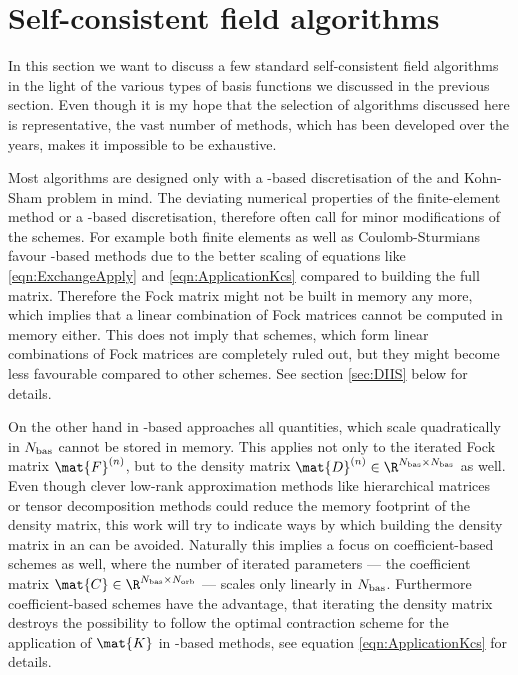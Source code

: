 \section{Self-consistent field algorithms}
\label{sec:SCFAlgorithms}

In this section we want to discuss a few standard self-consistent field algorithms
in the light of the various types of basis functions we discussed in the previous section.
Even though it is my hope that the selection of algorithms discussed here
is representative,
the vast number of methods,
which has been developed over the years,
makes it impossible to be exhaustive.

Most \SCF algorithms are designed only with a \cGTO-based
discretisation of the \HF and Kohn-Sham \DFT problem in mind.
The deviating numerical properties of the finite-element method
or a \CS-based discretisation,
therefore often call for minor modifications of the schemes.
For example both finite elements as well as Coulomb-Sturmians
favour \contraction-based methods
due to the better scaling of equations like \eqref{eqn:ExchangeApply}
and \eqref{eqn:ApplicationKcs}
compared to building the full matrix.
Therefore the Fock matrix might not be built in memory any more,
which implies that a linear combination of Fock matrices
cannot be computed in memory either.
This does not imply that \SCF schemes,
which form linear combinations of Fock matrices
are completely ruled out,
but they might become less favourable compared to other schemes.
See section \ref{sec:DIIS} below for details.

On the other hand in \FE-based approaches all quantities,
which scale quadratically in $N_\text{bas}$ cannot be stored in memory.
This applies not only to the iterated Fock matrix $\mat{F}^{(n)}$,
but to the density matrix $\mat{D}^{(n)} \in \R^{\Nbas\times \Nbas}$ as well.
Even though clever low-rank approximation methods
like hierarchical matrices~\cite{Hackbusch1999,Hackbusch2002,Grasedyck2003,Hackbusch2015}
or tensor decomposition methods
could reduce the memory footprint of the density matrix,
this work will try to indicate ways
by which building the density matrix in an \SCF can be avoided.
Naturally this implies
a focus on coefficient-based \SCF schemes as well,
where the number of iterated parameters
--- the coefficient matrix $\mat{C} \in \R^{\Nbas\times\Norb}$ ---
scales only linearly in $N_\text{bas}$.
Furthermore coefficient-based \SCF schemes have the advantage,
that iterating the density matrix
destroys the possibility to follow the optimal contraction scheme
for the application of $\mat{K}$ in \CS-based methods,
see equation \eqref{eqn:ApplicationKcs} for details.

